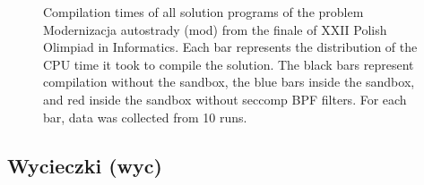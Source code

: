 \documentclass[en]{pracamgr}
\begin{document}
\begin{appendices}
\begin{figure}[H]
\caption{Compilation times of all solution programs of the problem Modernizacja autostrady (mod) from the finale of XXII Polish Olimpiad in Informatics. Each bar represents the distribution of the CPU time it took to compile the solution. The black bars represent compilation without the sandbox, the blue bars inside the sandbox, and red inside the sandbox without seccomp BPF filters. For each bar, data was collected from 10 runs.}
\label{figure:mod_compilation_cpu_time}
\end{figure}
\subsection{Wycieczki (wyc)}


\end{appendices}
\end{document}

